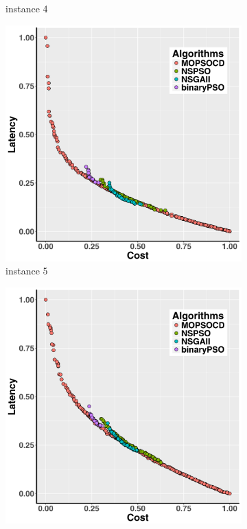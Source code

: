 \documentclass[10pt,journal,compsoc]{IEEEtran}
\begin{document}
\begin{figure}[ht]
\begin{subfigure}{0.21\linewidth}
    \caption{instance 4}
   \end{subfigure}
      \begin{subfigure}{0.21\linewidth}
       \includegraphics[width=\textwidth]{pics/total5.png}
    \caption{instance 5}
   \end{subfigure}
   \begin{subfigure}{0.21\linewidth}
       \includegraphics[width=\textwidth]{pics/total6.png}

\end{subfigure}
\end{figure}
\end{document}
